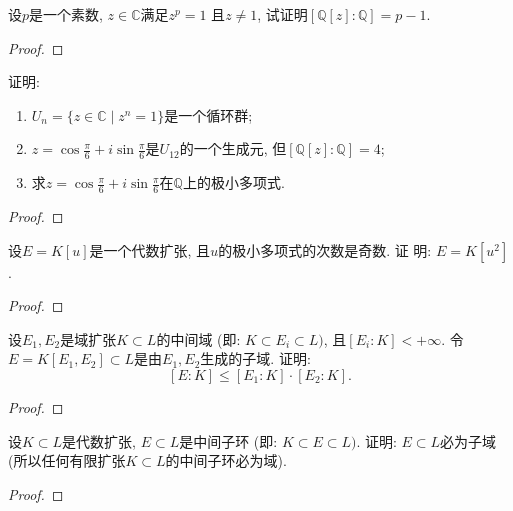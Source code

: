 \begin{problem}
    设$p$是一个素数, $z \in \mathbb{C}$满足$z^p = 1$
且$z \neq 1$, 试证明$[\mathbb{Q}[z]:\mathbb{Q}] = p - 1$.
\end{problem}

\begin{proof}
    
\end{proof}

\begin{problem}
    证明: 
\begin{enumerate}[(1)]
    \item $U_n = \{z \in \mathbb{C} \mid z^n = 1\}$是一个循环群;
    \item $z = \cos \frac\pi6 + i\sin \frac\pi6$是$U_{12}$的一个生成元,
但$[\mathbb{Q}[z]:\mathbb{Q}] = 4$;
    \item 求$z = \cos \frac\pi6 + i\sin \frac\pi6$在$\mathbb{Q}$上的极小多项式.
\end{enumerate}
\end{problem}

\begin{proof}
    
\end{proof}

\begin{problem}
    设$E = K[u]$是一个代数扩张, 且$u$的极小多项式的次数是奇数. 证
明: $E = K[u^2]$.
\end{problem}

\begin{proof}
    
\end{proof}

\begin{problem}
    设$E_1, E_2$是域扩张$K \subset L$的中间域
(即: $K \subset E_i \subset L)$, 且$[E_i:K] < +\infty$.
令$E = K[E_1,E_2] \subset L$是由$E_1, E_2$生成的子域.
证明: 
\[
    [E:K] \leqslant [E_1:K] \cdot [E_2:K].
\]
\end{problem}

\begin{proof}
    
\end{proof}

\begin{problem}
    设$K \subset L$是代数扩张, $E \subset L$是中间子环
(即: $K \subset E \subset L)$. 证明: $E\subset L$必为子域
(所以任何有限扩张$K \subset L$的中间子环必为域).
\end{problem}

\begin{proof}
    
\end{proof}

